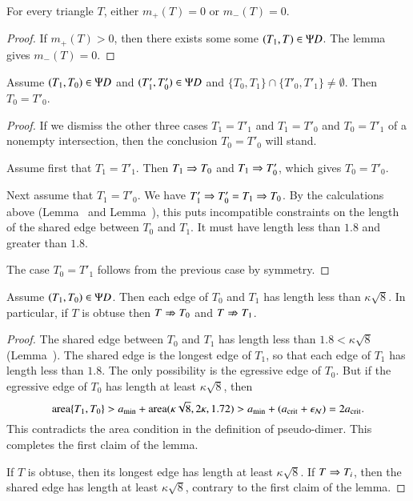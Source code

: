 \begin{corollary}  
  For every triangle $T$, either $m_+(T)=0$ or $m_-(T)=0$.
\end{corollary}

\begin{proof}  
  If $m_+(T)>0$, then there exists some some $(T_1,T)\in\Psi D$.  The
  lemma gives $m_-(T)=0$.
\end{proof}

\begin{lemma}  
  Assume $(T_1,T_0)\in \Psi D$ and $(T'_1,T'_0)\in\Psi D$ and
  $\{T_0,T_1\}\cap\{T'_0,T'_1\} \ne \emptyset$.  Then $T_0 = T'_0$.
\end{lemma}

\begin{proof}  
  If we dismiss the other three cases $T_1=T'_1$ and $T_1=T'_0$ and
  $T_0=T'_1$ of a nonempty intersection, then the conclusion $T_0 =
  T'_0$ will stand.

  Assume first that $T_1 = T'_1$.  Then $T_1\Rightarrow T_0$ and $T_1\Rightarrow
  T'_0$, which gives $T_0=T'_0$.

  Next assume that $T_1=T'_0$.  We have $T'_1\Rightarrow T'_0 = T_1 \Rightarrow T_0$.
  By the calculations above (Lemma~ and
  Lemma~), this puts incompatible constraints on the
  length of the shared edge between $T_0$ and $T_1$.  It must have
  length less than $1.8$ and greater than $1.8$.

  The case $T_0=T'_1$ follows from the previous case by symmetry.
\end{proof}

\begin{lemma}
  Assume $(T_1,T_0)\in\Psi D$.  Then each edge of $T_0$ and $T_1$ has
  length less than $\kappa\sqrt8$.  In particular, if $T$ is obtuse
  then $T\nRightarrow T_0$ and $T \nRightarrow T_1$.
\end{lemma}

\begin{proof} 
  The shared edge between $T_0$ and $T_1$ has length less than $1.8 <
  \kappa\sqrt8$ (Lemma~).  The shared edge is the
  longest edge of $T_1$, so that each edge of $T_1$ has length less
  than $1.8$.  The only possibility is the egressive edge of $T_0$.
  But if the egressive edge of $T_0$ has length at least
  $\kappa\sqrt8$, then
\[
{\operatorname{area}}\{T_1,T_0\} > a_\text{min} + {\operatorname{area}}(\kappa\sqrt8,2\kappa,1.72) 
> a_\text{min} + (a_\text{crit} + \epsilon_{\mathcal N}) = 2a_\text{crit}.
\]
This contradicts the area condition in the definition of pseudo-dimer.
This completes the first claim of the lemma.

If $T$ is obtuse, then its longest edge has length at least
$\kappa\sqrt8$.  If $T\Rightarrow T_i$, then the shared edge has length at
least $\kappa\sqrt8$, contrary to the first claim of the lemma.
\end{proof}

